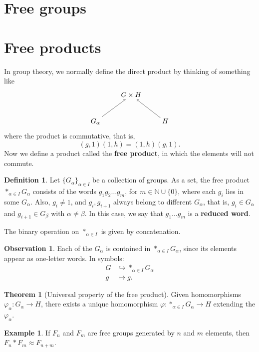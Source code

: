 \documentclass{book}
\theoremstyle{definition}
\newtheorem*{defn}{Definition}
\newtheorem*{obs}{Observation}
\newtheorem*{teo}{Theorem}
\newtheorem*{ejem}{Example}
\newcommand{\N}{\mathbb{N}}
\begin{document}
\section{Free groups}

\section{Free products}

In group theory, we normally define the direct product by
thinking of something like
$$
\xymatrix{
& G\times H \\
G_\alpha \ar[ur] && H \ar[ul]
}
$$
where the product is commutative, that is,
$$
(g,1)(1,h)=(1,h)(g,1).
$$
Now we define a product called the \textbf{free product}, in
which the elements will not commute.

\begin{defn}
Let $\{G_\alpha\}_{\alpha\in I}$ be a collection of groups.
As a set, the free product $\ast_{\alpha\in I}G_\alpha$
consists of the words $g_1g_2\ldots g_m$, for
$m\in\N\cup\{0\}$, where each $g_i$ lies in some
$G_\alpha$. Also, $g_i\neq1$, and $g_i,g_{i+1}$ always
belong to different $G_\alpha$, that is, $g_i\in G_\alpha$
and $g_{i+1}\in G_\beta$ with $\alpha\neq\beta$. In this
case, we say that $g_1\ldots g_m$ is a
\textbf{reduced word}.

The binary operation on $\ast_{\alpha\in I}$ is given by
concatenation.
\end{defn}

\begin{obs}
Each of the $G_\alpha$ is contained in
$\ast_{\alpha\in I}G_\alpha$, since its elements appear as
one-letter words. In symbols:
$$
\begin{aligned}
G&\hookrightarrow\ast_{\alpha\in I}G_\alpha\\
g&\mapsto g.
\end{aligned}
$$
\end{obs}

\begin{teo}[Universal property of the free product]
Given homomorphisms $\varphi_\alpha:G_\alpha\to H$, there
exists a unique homomorphism
$\varphi:\ast_{\alpha\in I}G_\alpha\to H$ extending the
$\varphi_\alpha$.
\end{teo}

\begin{ejem}
If $F_n$ and $F_m$ are free groups generated by $n$ and $m$
elements, then $F_n*F_m\approx F_{n+m}$.
\end{ejem}
\end{document}
